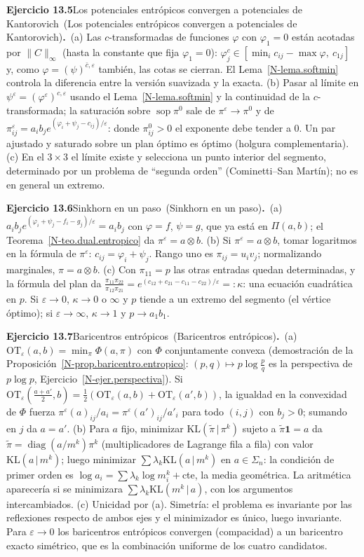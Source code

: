 \documentclass[11pt,a4paper]{amsart}
\def\sop{\operatorname {\mathrm{sop}}}
\newcommand{\ve}{\varepsilon}
\theoremstyle{remark}
\theoremstyle{definition}
\numberwithin{subsection}{section}
\numberwithin{equation}{section}
\newcommand{\ejlabel}[2]{\par\medskip\noindent\textbf{Ejercicio #1}\ifx\relax#2\relax\else\ (#2)\fi\textbf{.}\ }
\begin{document}
\ejlabel{13.5}{Los potenciales entrópicos convergen a potenciales de Kantorovich}(a) Las $c$-transformadas de funciones $\varphi$ con $\varphi_1=0$ están acotadas por $\|C\|_\infty$ (hasta la constante que fija $\varphi_1=0$): $\varphi^c_j\in[\min_ic_{ij}-\max\varphi,\ c_{1j}]$ y, como $\varphi=(\psi)^{\bar c,\ve}$ también, las cotas se cierran. El Lema~\ref{N-lema.softmin} controla la diferencia entre la versión suavizada y la exacta. (b) Pasar al límite en $\psi^\ve=(\varphi^\ve)^{c,\ve}$ usando el Lema~\ref{N-lema.softmin} y la continuidad de la $c$-transformada; la saturación sobre $\sop\pi^0$ sale de $\pi^\ve\to\pi^0$ y de $\pi^\ve_{ij}=a_ib_je^{(\varphi_i+\psi_j-c_{ij})/\ve}$: donde $\pi^0_{ij}>0$ el exponente debe tender a $0$. Un par ajustado y saturado sobre un plan óptimo es óptimo (holgura complementaria). (c) En el $3\times3$ el límite existe y selecciona un punto interior del segmento, determinado por un problema de ``segunda orden'' (Cominetti--San Martín); no es en general un extremo.

\ejlabel{13.6}{Sinkhorn en un paso}(a) $a_ib_je^{(\varphi_i+\psi_j-f_i-g_j)/\ve}=a_ib_j$ con $\varphi=f$, $\psi=g$, que ya está en $\Pi(a,b)$; el Teorema~\ref{N-teo.dual.entropico} da $\pi^\ve=a\otimes b$. (b) Si $\pi^\ve=a\otimes b$, tomar logaritmos en la fórmula de $\pi^\ve$: $c_{ij}=\varphi_i+\psi_j$. Rango uno es $\pi_{ij}=u_iv_j$; normalizando marginales, $\pi=a\otimes b$. (c) Con $\pi_{11}=p$ las otras entradas quedan determinadas, y la fórmula del plan da $\frac{\pi_{11}\pi_{22}}{\pi_{12}\pi_{21}}=e^{(c_{12}+c_{21}-c_{11}-c_{22})/\ve}=:\kappa$: una ecuación cuadrática en $p$. Si $\ve\to0$, $\kappa\to0$ o $\infty$ y $p$ tiende a un extremo del segmento (el vértice óptimo); si $\ve\to\infty$, $\kappa\to1$ y $p\to a_1b_1$.

\ejlabel{13.7}{Baricentros entrópicos}(a) $\mathrm{OT}_\ve(a,b)=\min_\pi\Phi(a,\pi)$ con $\Phi$ conjuntamente convexa (demostración de la Proposición~\ref{N-prop.baricentro.entropico}: $(p,q)\mapsto p\log\frac pq$ es la perspectiva de $p\log p$, Ejercicio~\ref{N-ejer.perspectiva}). Si $\mathrm{OT}_\ve(\frac{a+a'}2,b)=\frac12(\mathrm{OT}_\ve(a,b)+\mathrm{OT}_\ve(a',b))$, la igualdad en la convexidad de $\Phi$ fuerza $\pi^{\ve}(a)_{ij}/a_i=\pi^\ve(a')_{ij}/a'_i$ para todo $(i,j)$ con $b_j>0$; sumando en $j$ da $a=a'$. (b) Para $a$ fijo, minimizar $\mathrm{KL}(\tilde\pi\,|\,\pi^k)$ sujeto a $\tilde\pi\mathbf 1=a$ da $\tilde\pi=\operatorname{diag}(a/m^k)\pi^k$ (multiplicadores de Lagrange fila a fila) con valor $\mathrm{KL}(a\,|\,m^k)$; luego minimizar $\sum\lambda_k\mathrm{KL}(a\,|\,m^k)$ en $a\in\Sigma_n$: la condición de primer orden es $\log a_i=\sum\lambda_k\log m^k_i+$cte, la media geométrica. La aritmética aparecería si se minimizara $\sum\lambda_k\mathrm{KL}(m^k\,|\,a)$, con los argumentos intercambiados. (c) Unicidad por (a). Simetría: el problema es invariante por las reflexiones respecto de ambos ejes y el minimizador es único, luego invariante. Para $\ve\to0$ los baricentros entrópicos convergen (compacidad) a un baricentro exacto simétrico, que es la combinación uniforme de los cuatro candidatos.
\end{document}
